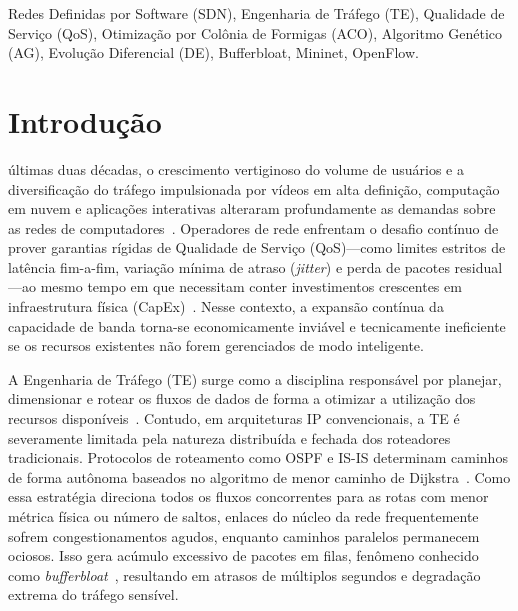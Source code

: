 \documentclass[journal]{IEEEtran}
\begin{document}
\begin{IEEEkeywords}
Redes Definidas por Software (SDN), Engenharia de Tr\'{a}fego (TE), Qualidade de Servi\c{c}o (QoS), Otimiza\c{c}\~{a}o por Col\^{o}nia de Formigas (ACO), Algoritmo Gen\'{e}tico (AG), Evolu\c{c}\~{a}o Diferencial (DE), Bufferbloat, Mininet, OpenFlow.
\end{IEEEkeywords}

\section{Introdu\c{c}\~{a}o}
 \'{u}ltimas duas d\'{e}cadas, o crescimento vertiginoso do volume de usu\'{a}rios e a diversifica\c{c}\~{a}o do tr\'{a}fego impulsionada por v\'{i}deos em alta defini\c{c}\~{a}o, computa\c{c}\~{a}o em nuvem e aplica\c{c}\~{o}es interativas alteraram profundamente as demandas sobre as redes de computadores~\cite{kreutz2015software}. Operadores de rede enfrentam o desafio cont\'{i}nuo de prover garantias r\'{i}gidas de Qualidade de Servi\c{c}o (QoS)---como limites estritos de lat\^{e}ncia fim-a-fim, varia\c{c}\~{a}o m\'{i}nima de atraso (\emph{jitter}) e perda de pacotes residual---ao mesmo tempo em que necessitam conter investimentos crescentes em infraestrutura f\'{i}sica (CapEx)~\cite{wang2008qos}. Nesse contexto, a expans\~{a}o cont\'{i}nua da capacidade de banda torna-se economicamente invi\'{a}vel e tecnicamente ineficiente se os recursos existentes n\~{a}o forem gerenciados de modo inteligente.

A Engenharia de Tr\'{a}fego (TE) surge como a disciplina respons\'{a}vel por planejar, dimensionar e rotear os fluxos de dados de forma a otimizar a utiliza\c{c}\~{a}o dos recursos dispon\'{i}veis~\cite{awduche2002overview, fortz2002traffic}. Contudo, em arquiteturas IP convencionais, a TE \'{e} severamente limitada pela natureza distribu\'{i}da e fechada dos roteadores tradicionais. Protocolos de roteamento como OSPF e IS-IS determinam caminhos de forma aut\^{o}noma baseados no algoritmo de menor caminho de Dijkstra~\cite{dijkstra1959note}. Como essa estrat\'{e}gia direciona todos os fluxos concorrentes para as rotas com menor m\'{e}trica f\'{i}sica ou n\'{u}mero de saltos, enlaces do n\'{u}cleo da rede frequentemente sofrem congestionamentos agudos, enquanto caminhos paralelos permanecem ociosos. Isso gera ac\'{u}mulo excessivo de pacotes em filas, fen\^{o}meno conhecido como \emph{bufferbloat}~\cite{gettys2011bufferbloat}, resultando em atrasos de m\'{u}ltiplos segundos e degrada\c{c}\~{a}o extrema do tr\'{a}fego sens\'{i}vel.
\end{document}
